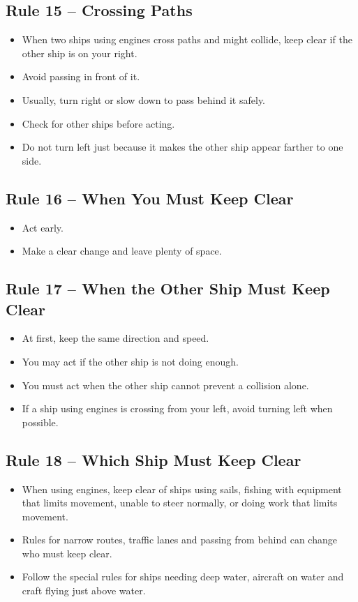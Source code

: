 \documentclass[10pt]{reportMaster}
\begin{document}
\subsection*{Rule 15 -- Crossing Paths}
\begin{itemize}
\item When two ships using engines cross paths and might collide, keep clear if the other ship is on your right.
\item Avoid passing in front of it.
\item Usually, turn right or slow down to pass behind it safely.
\item Check for other ships before acting.
\item Do not turn left just because it makes the other ship appear farther to one side.
\end{itemize}

\subsection*{Rule 16 -- When You Must Keep Clear}
\begin{itemize}
\item Act early.
\item Make a clear change and leave plenty of space.
\end{itemize}

\subsection*{Rule 17 -- When the Other Ship Must Keep Clear}
\begin{itemize}
\item At first, keep the same direction and speed.
\item You may act if the other ship is not doing enough.
\item You must act when the other ship cannot prevent a collision alone.
\item If a ship using engines is crossing from your left, avoid turning left when possible.
\end{itemize}

\subsection*{Rule 18 -- Which Ship Must Keep Clear}
\begin{itemize}
\item When using engines, keep clear of ships using sails, fishing with equipment that limits movement, unable to steer normally, or doing work that limits movement.
\item Rules for narrow routes, traffic lanes and passing from behind can change who must keep clear.
\item Follow the special rules for ships needing deep water, aircraft on water and craft flying just above water.
\end{itemize}
\end{document}
